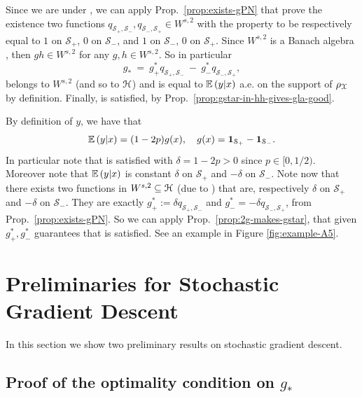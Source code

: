 Since we are under , we can apply Prop.~\ref{prop:exists-gPN} that prove the existence two functions $q_{\mathcal{S}_+, \mathcal{S}_-}, q_{\mathcal{S}_-, \mathcal{S}_+} \in W^{s,2}$ with the property to be respectively equal to $1$ on $\mathcal{S}_+$, $0$ on $\mathcal{S}_-$, and $1$ on $\mathcal{S}_-$, $0$ on $\mathcal{S}_+$. 
Since $W^{s,2}$ is a Banach algebra \citep[see][]{adams2003sobolev}, then $g h \in W^{s,2}$ for any $g, h \in W^{s,2}$. So in particular 
$$g_\ast ~=~ g_+^*  q_{\mathcal{S}_+,\mathcal{S}_-} ~-~ g_-^*  q_{\mathcal{S}_-, \mathcal{S}_+},$$
belongs to $W^{s,2}$ (and so to $\mathcal H$) and is equal to $\mathbb{E}\left({y}\middle|{x}\right)$ a.e. on the support of ${\rho_{{\mathcal X}}}$ by definition. Finally,  is satisfied, by Prop.~\ref{prop:gstar-in-hh-gives-gla-good}.
\epr

By definition of $y$, we have that
$$\mathbb{E}\left({y}\middle|{x}\right) = (1-2p)g(x), \quad g(x) = {\mathbf 1}_{\mathcal{S}_+} - {\mathbf 1}_{\mathcal{S}_-}.$$
In particular note that  is satisfied with $\delta = 1-2p > 0$ since $p \in [0,1/2)$. Moreover note that  $\mathbb{E}\left({y}\middle|{x}\right)$ is constant $\delta$ on $\mathcal{S}_+$ and $-\delta$ on $\mathcal{S}_-$. Note now that there exists two functions in $W^{s,2} \subseteq \mathcal H$ (due to ) that are, respectively $\delta$ on $\mathcal{S}_+$ and $-\delta$ on $\mathcal{S}_-$. They are exactly $g^*_+ := \delta q_{\mathcal{S}_+, \mathcal{S}_-}$ and $g^\ast_- = -\delta q_{\mathcal{S}_-, \mathcal{S}_+}$, from Prop.~\ref{prop:exists-gPN}. So we can apply Prop.~\ref{prop:2g-makes-gstar}, that given $g^\ast_+, g^*_-$ guarantees that  is satisfied. See an example in Figure \ref{fig:example-A5}.
\epr

\section{Preliminaries for Stochastic Gradient Descent}
\label{ap:SGDdevelopment}

In this section we show two preliminary results on stochastic gradient descent.

\subsection{Proof of the optimality condition on \texorpdfstring{$g_*$}{g*}}
\label{ap:optimality}

